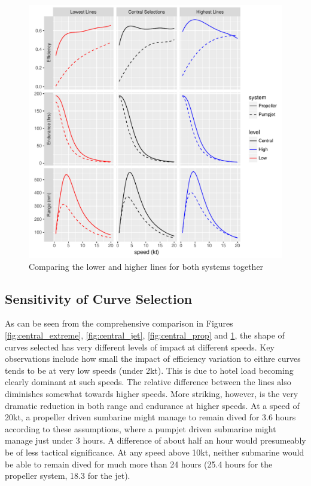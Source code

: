 \documentclass{article}\usepackage[]{graphicx}\usepackage[]{color}
\makeatletter
\def\maxwidth{ %
  \ifdim\Gin@nat@width>\linewidth
    \linewidth
  \else
    \Gin@nat@width
  \fi
}
\newenvironment{knitrout}{}{} %
\makeatother
\begin{document}
\begin{figure}
\begin{knitrout}
\color{fgcolor}

{\centering \includegraphics[width=\maxwidth]{figures/plots-plot_results4-1} 

}



\end{knitrout}
\caption{Comparing the lower and higher lines for both systems together}
\label{fig:bottom_top}
\end{figure}

\subsection{Sensitivity of Curve Selection}
As can be seen from the comprehensive comparison in Figures \ref{fig:central_extreme}, \ref{fig:central_jet}, \ref{fig:central_prop} and \ref{fig:bottom_top}, the shape of curves selected has very different levels of impact at different speeds.  Key observations include how small the impact of efficiency variation to eithre curves tends to be at very low speeds (under 2kt).  This is due to hotel load becoming clearly dominant at such speeds.  The relative difference between the lines also diminishes somewhat towards higher speeds.  More striking, however, is the very dramatic reduction in both range and endurance at higher speeds. At a speed of 20kt, a propeller driven sumbarine might manage to remain dived for 3.6 hours according to these assumptions, where a pumpjet driven submarine might manage just under 3 hours.  A difference of about half an hour would presumeably be of less tactical significance. At any speed above 10kt, neither submarine would be able to remain dived for much more than 24 hours (25.4 hours for the propeller system, 18.3 for the jet).
\end{document}
